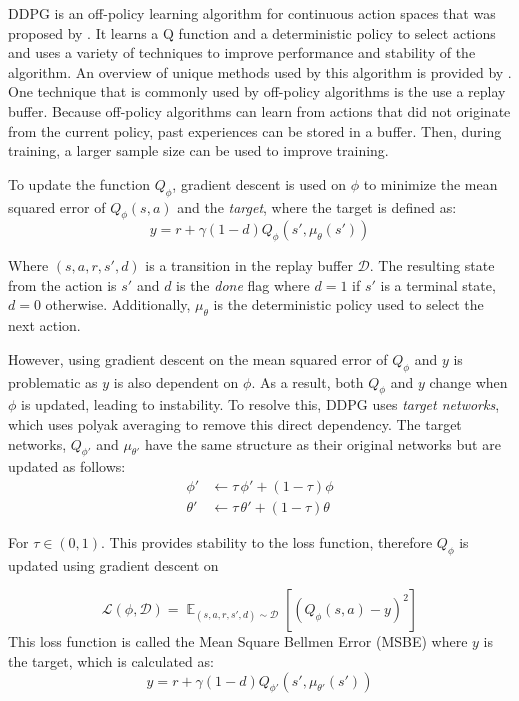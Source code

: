 \documentclass[conference]{IEEEtran}
\begin{document}
DDPG is an off-policy learning algorithm for continuous action spaces that was proposed by \cite{DDPG}. It learns a Q function and a deterministic policy to select actions and uses a variety of techniques to improve performance and stability of the algorithm. An overview of unique methods used by this algorithm is provided by \cite{spinning_up_ddpg}. One technique that is commonly used by off-policy algorithms is the use a replay buffer. Because off-policy algorithms can learn from actions that did not originate from the current policy, past experiences can be stored in a buffer. Then, during training, a larger sample size can be used to improve training.

To update the function $Q_\phi$, gradient descent is used on $\phi$ to minimize the mean squared error of $Q_\phi(s, a)$ and the \textit{target}, where the target is defined as:
$$
    y = r + \gamma(1-d)Q_\phi(s', \mu_\theta(s'))
$$

Where $(s, a, r, s', d)$ is a transition in the replay buffer $\mathcal{D}$. The resulting state from the action is $s'$ and $d$ is the \textit{done} flag where $d=1$ if $s'$ is a terminal state, $d=0$ otherwise. Additionally, $\mu_\theta$ is the deterministic policy used to select the next action.

However, using gradient descent on the mean squared error of $Q_\phi$ and $y$ is problematic as $y$ is also dependent on $\phi$. As a result, both $Q_\phi$ and $y$ change when $\phi$ is updated, leading to instability. To resolve this, DDPG uses \textit{target networks}, which uses polyak averaging to remove this direct dependency. The target networks, $Q_{\phi'}$ and $\mu_{\theta'}$ have the same structure as their original networks but are updated as follows:
\begin{align*}
    \phi'   & \leftarrow \tau \, \phi' + (1 - \tau) \phi     \\
    \theta' & \leftarrow \tau \, \theta' + (1 - \tau) \theta
\end{align*}

\begin{flushleft}
    For $\tau \in (0, 1)$. This provides stability to the loss function, therefore $Q_\phi$ is updated using gradient descent on
\end{flushleft}

$$
    \mathcal{L}(\phi, \mathcal{D}) = \mathop{\mathbb{E}}_{(s,a,r,s',d) \sim \mathcal{D}}\left[\left(Q_\phi(s,a) - y\right)^2\right]
$$
This loss function is called the Mean Square Bellmen Error (MSBE) where $y$ is the target, which is calculated as:
$$
    y = r + \gamma(1-d)Q_{\phi'}(s', \mu_{\theta'}(s'))
$$
\end{document}
